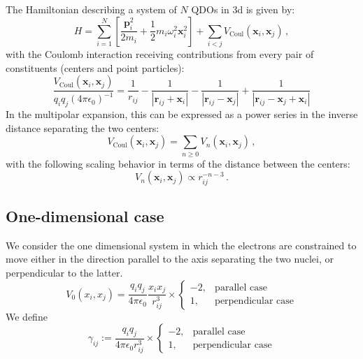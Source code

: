 \documentclass[reprint, amsmath, amssymb, aps]{revtex4-2}
\begin{document}
    The Hamiltonian describing a system of $N$ QDOs in 3d is given by:
    \begin{equation}
    \label{eq:full_QDO_Hamiltonian}
        H=\sum_{i=1}^N\left[\frac{\bm{p} _i^2}{2m_i} + \frac{1}{2}m_i\omega_i^2\bm{x} _i^2\right] +\sum_{i<j}V_\text{Coul}\left(\bm{x} _i, \bm{x} _j\right)\,,
    \end{equation}
    with the Coulomb interaction receiving contributions from every pair of constituents (centers and point particles):
    \begin{equation}
    \label{eq:full_coulomb_potential}
        \frac{V_\text{Coul}\left(\bm{x} _i, \bm{x} _j\right)}{q_iq_j(4\pi\epsilon_0)^{-1}}=\frac{1}{r_{ij}} - \frac{1}{|\bm{r}_{ij}  + \bm{x} _i|} - \frac{1}{|\bm{r}_{ij}  - \bm{x} _j|} + \frac{1}{|\bm{r}_{ij} - \bm{x} _j + \bm{x} _i|}
    \end{equation}
    In the multipolar expansion, this can be expressed as a power series in the inverse distance separating the two centers:
    \begin{equation}
        V_\text{Coul}\left(\bm{x} _i, \bm{x} _j\right)= \sum_{n\geq 0} V_n\left(\bm{x} _i, \bm{x} _j\right)\,,
    \end{equation}
    with the following scaling behavior in terms of the distance between the centers:
    \begin{equation}
        V_n\left(\bm{x} _i, \bm{x} _j\right)\propto r_{ij}^{-n-3}\,.
    \end{equation}

        \subsection{One-dimensional case}

        We consider the one dimensional system in which the electrons are constrained to move either in the direction parallel to the axis separating the two nuclei, or perpendicular to the latter.
        \begin{equation}
            V_0(x_i, x_j) = \frac{q_iq_j}{4\pi\epsilon_0}\frac{x_ix_j}{r_{ij}^3}\times
            \begin{cases}
                -2, & \text{parallel case} \\
                1, & \text{perpendicular case}
            \end{cases}
        \end{equation}
        We define
        \begin{equation}
            \gamma_{ij} := \frac{q_iq_j}{4\pi\epsilon_0r_{ij}^3}\times
            \begin{cases}
                -2, & \text{parallel case} \\
                1, & \text{perpendicular case}
            \end{cases}
        \end{equation}
\end{document}

